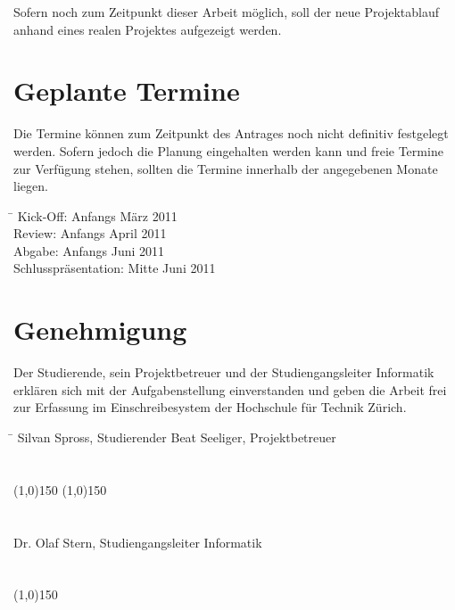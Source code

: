 \documentclass[]{scrreprt}
\begin{document}
    Sofern noch zum Zeitpunkt dieser Arbeit möglich, soll der neue 
    Projektablauf anhand eines realen Projektes aufgezeigt werden.

    \section{Geplante Termine}
    Die Termine können zum Zeitpunkt des Antrages noch nicht definitiv 
    festgelegt werden. Sofern jedoch die Planung eingehalten werden kann und 
    freie Termine zur Verfügung stehen, sollten die Termine innerhalb der 
    angegebenen Monate liegen.

    \begin{tabbing}
        \hspace*{4cm}\= \kill
    	Kick-Off:               \> Anfangs März 2011\\
    	Review:                 \> Anfangs April 2011\\
    	Abgabe:                 \> Anfangs Juni 2011\\
    	Schlusspräsentation:    \> Mitte Juni 2011 \\
    \end{tabbing}

    \section{Genehmigung}
    Der Studierende, sein Projektbetreuer und der Studiengangsleiter 
    Informatik erklären sich mit der Aufgabenstellung einverstanden und geben 
    die Arbeit frei zur Erfassung im Einschreibesystem der Hochschule für 
    Technik Zürich.

    \begin{tabbing}
        \hspace*{10cm}\= \kill
    	Silvan Spross, Studierender \> Beat Seeliger, Projektbetreuer \\\\\\
        \line(1,0){150} \> \line(1,0){150} \\\\\\
    	Dr. Olaf Stern, Studiengangsleiter Informatik \\\\\\
        \line(1,0){150}
    \end{tabbing}
    
    
    
    
\end{document}
